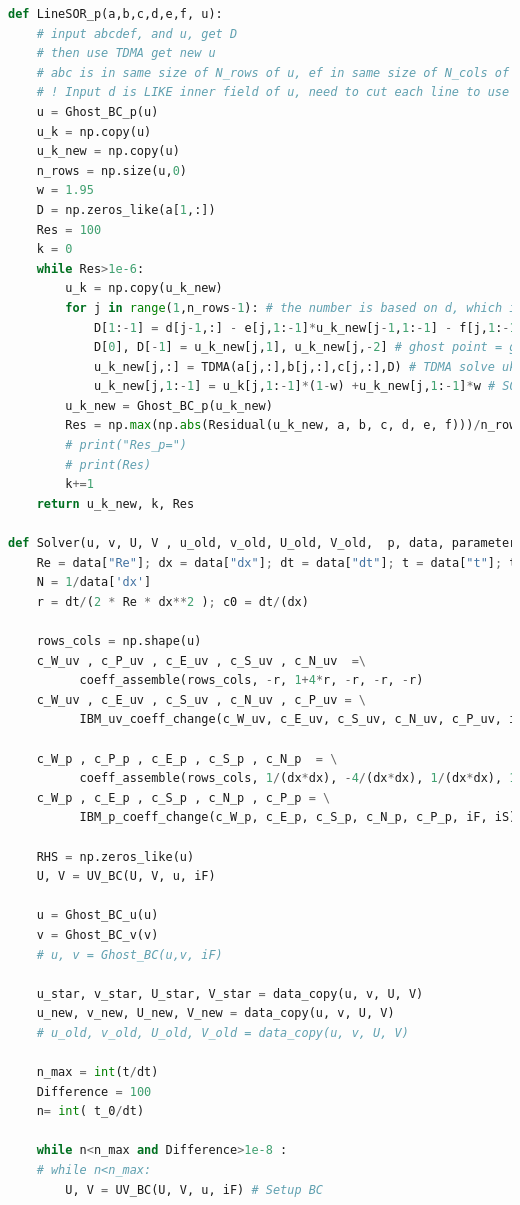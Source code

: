 \documentclass[12pt]{article}
\begin{document}
\begin{scriptsize}
\begin{lstlisting}[language=python,caption={N-S Cylinder Solver}]
def LineSOR_p(a,b,c,d,e,f, u): 
    # input abcdef, and u, get D
    # then use TDMA get new u
    # abc is in same size of N_rows of u, ef in same size of N_cols of u
    # ! Input d is LIKE inner field of u, need to cut each line to use !
    u = Ghost_BC_p(u)
    u_k = np.copy(u)
    u_k_new = np.copy(u)
    n_rows = np.size(u,0)
    w = 1.95
    D = np.zeros_like(a[1,:])
    Res = 100
    k = 0
    while Res>1e-6:
        u_k = np.copy(u_k_new) 
        for j in range(1,n_rows-1): # the number is based on d, which is (N-1)x(N-1)
            D[1:-1] = d[j-1,:] - e[j,1:-1]*u_k_new[j-1,1:-1] - f[j,1:-1]*u_k_new[j+1,1:-1]
            D[0], D[-1] = u_k_new[j,1], u_k_new[j,-2] # ghost point = ghost point
            u_k_new[j,:] = TDMA(a[j,:],b[j,:],c[j,:],D) # TDMA solve uk each line
            u_k_new[j,1:-1] = u_k[j,1:-1]*(1-w) +u_k_new[j,1:-1]*w # SOR term
        u_k_new = Ghost_BC_p(u_k_new)
        Res = np.max(np.abs(Residual(u_k_new, a, b, c, d, e, f)))/n_rows**2
        # print("Res_p=")
        # print(Res) 
        k+=1
    return u_k_new, k, Res

def Solver(u, v, U, V , u_old, v_old, U_old, V_old,  p, data, parameter_field):
    Re = data["Re"]; dx = data["dx"]; dt = data["dt"]; t = data["t"]; t_0 = data['t_0']
    N = 1/data['dx']
    r = dt/(2 * Re * dx**2 ); c0 = dt/(dx)

    rows_cols = np.shape(u)
    c_W_uv , c_P_uv , c_E_uv , c_S_uv , c_N_uv  =\
          coeff_assemble(rows_cols, -r, 1+4*r, -r, -r, -r)
    c_W_uv , c_E_uv , c_S_uv , c_N_uv , c_P_uv = \
          IBM_uv_coeff_change(c_W_uv, c_E_uv, c_S_uv, c_N_uv, c_P_uv, iF, iS)
    
    c_W_p , c_P_p , c_E_p , c_S_p , c_N_p  = \
          coeff_assemble(rows_cols, 1/(dx*dx), -4/(dx*dx), 1/(dx*dx), 1/(dx*dx), 1/(dx*dx))
    c_W_p , c_E_p , c_S_p , c_N_p , c_P_p = \
          IBM_p_coeff_change(c_W_p, c_E_p, c_S_p, c_N_p, c_P_p, iF, iS)
    
    RHS = np.zeros_like(u)
    U, V = UV_BC(U, V, u, iF)

    u = Ghost_BC_u(u)
    v = Ghost_BC_v(v)
    # u, v = Ghost_BC(u,v, iF)

    u_star, v_star, U_star, V_star = data_copy(u, v, U, V) 
    u_new, v_new, U_new, V_new = data_copy(u, v, U, V) 
    # u_old, v_old, U_old, V_old = data_copy(u, v, U, V)

    n_max = int(t/dt)
    Difference = 100
    n= int( t_0/dt)

    while n<n_max and Difference>1e-8 :
    # while n<n_max:
        U, V = UV_BC(U, V, u, iF) # Setup BC
        

\end{lstlisting}
\end{scriptsize}
\end{document}
